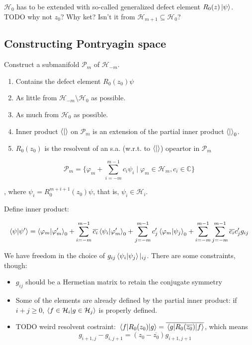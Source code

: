 \documentclass[12pt, a4paper]{article}
\newcommand{\hilb}[1]{\mathcal{H}_{#1}}
\newcommand{\cconj}[1]{\overline{#1}}
\begin{document}
$\hilb{0}$ has to be extended with so-called generalized defect element $R_0(z) \ket{\psi}$. TODO why not $z_0$? Why ket? Isn't it from $\hilb{m + 1} \subseteq \hilb{0}$?


\subsection{Constructing Pontryagin space}
Construct a submanifold $\mathcal{P}_m$ of $\hilb{-m}$.

\begin{enumerate}
\item Contains the defect element $R_0(z_0) \psi$
\item As little from $\hilb{-m} \setminus \hilb{0}$ as possible.
\item As much from $\hilb{0}$ as possible.
\item Inner product $\ip{}{}$ on $\mathcal{P}_m$ is an extension of the partial inner product $\ip{}{}_0$.
\item $R_0(z_0)$ is the resolvent of an s.a. (w.r.t. to $\ip{}{}$) opeartor in $\mathcal{P}_m$
\end{enumerate}

\[
\mathcal{P}_m = 
\{ \varphi_m + \sum\limits_{i = -m}^{m - 1} c_i \psi_i \mid \varphi_m \in \hilb{m}, c_i \in \mathbb{C}\}
\]

, where $\psi_i = R_0^{m + i + 1}(z_0) \psi$, that is, $\psi_i \in \hilb{i}$.

Define inner product:

\[
\ip{\psi}{\psi'} =
\ip{\varphi_m}{\varphi'_m}_0 +
\sum\limits_{i = -m}^{m - 1} \cconj{c_i} \ip{\psi_i}{\varphi'_m}_0 +
\sum\limits_{j = -m}^{m - 1} c'_j \ip{\varphi_m}{\psi_j}_0 +
\sum\limits_{i = -m}^{m - 1} \sum\limits_{j = -m}^{m - 1} \cconj{c_i} c_j' g_{ij}
\]

We have freedom in the choice of $g_{ij} \ip{\psi_i}{\psi_j} |_{ij}$. There are some constraints, though:

\begin{itemize}
\item $g_{ij}$ should be a Hermetian matrix to retain the conjugate symmetry
\item Some of the elements are already defined by the partial inner product: if $i + j \ge 0$, $\ip{f \in \hilb{i}}{g \in \hilb{j}}$ is properly defined.
\item TODO weird resolvent costraint: $\mel{f}{R_0(z_0)}{g} = \cconj{\mel{g}{R_0(\cconj{z_0})}{f}}$, which means
\[
g_{i + 1, j} - g_{i, j + 1} = (z_0 - \cconj{z_0}) g_{i + 1, j + 1}
\]
\end{itemize}
\end{document}
